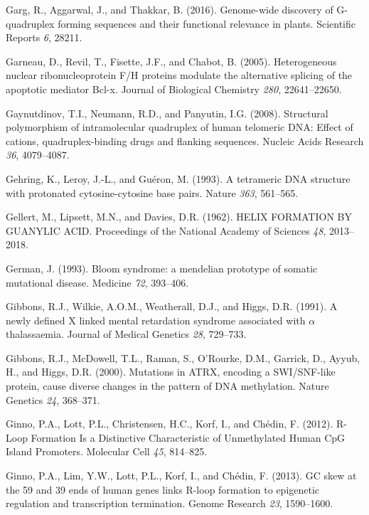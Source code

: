 \documentclass[12pt,a4paper,]{report}
\begin{document}
\leavevmode\hypertarget{ref-Garg2016}{}%
Garg, R., Aggarwal, J., and Thakkar, B. (2016). Genome-wide discovery of
G-quadruplex forming sequences and their functional relevance in plants.
Scientific Reports \emph{6}, 28211.

\leavevmode\hypertarget{ref-Garneau2005}{}%
Garneau, D., Revil, T., Fisette, J.F., and Chabot, B. (2005).
Heterogeneous nuclear ribonucleoprotein F/H proteins modulate the
alternative splicing of the apoptotic mediator Bcl-x. Journal of
Biological Chemistry \emph{280}, 22641--22650.

\leavevmode\hypertarget{ref-Gaynutdinov2008}{}%
Gaynutdinov, T.I., Neumann, R.D., and Panyutin, I.G. (2008). Structural
polymorphism of intramolecular quadruplex of human telomeric DNA: Effect
of cations, quadruplex-binding drugs and flanking sequences. Nucleic
Acids Research \emph{36}, 4079--4087.

\leavevmode\hypertarget{ref-Gehring1993}{}%
Gehring, K., Leroy, J.-L., and Guéron, M. (1993). A tetrameric DNA
structure with protonated cytosine-cytosine base pairs. Nature
\emph{363}, 561--565.

\leavevmode\hypertarget{ref-Gellert1962}{}%
Gellert, M., Lipsett, M.N., and Davies, D.R. (1962). HELIX FORMATION BY
GUANYLIC ACID. Proceedings of the National Academy of Sciences
\emph{48}, 2013--2018.

\leavevmode\hypertarget{ref-German1993}{}%
German, J. (1993). Bloom syndrome: a mendelian prototype of somatic
mutational disease. Medicine \emph{72}, 393--406.

\leavevmode\hypertarget{ref-Gibbons1991}{}%
Gibbons, R.J., Wilkie, A.O.M., Weatherall, D.J., and Higgs, D.R. (1991).
A newly defined X linked mental retardation syndrome associated with
\(\alpha\) thalassaemia. Journal of Medical Genetics \emph{28},
729--733.

\leavevmode\hypertarget{ref-Gibbons2000}{}%
Gibbons, R.J., McDowell, T.L., Raman, S., O'Rourke, D.M., Garrick, D.,
Ayyub, H., and Higgs, D.R. (2000). Mutations in ATRX, encoding a
SWI/SNF-like protein, cause diverse changes in the pattern of DNA
methylation. Nature Genetics \emph{24}, 368--371.

\leavevmode\hypertarget{ref-Ginno2012}{}%
Ginno, P.A., Lott, P.L., Christensen, H.C., Korf, I., and Chédin, F.
(2012). R-Loop Formation Is a Distinctive Characteristic of Unmethylated
Human CpG Island Promoters. Molecular Cell \emph{45}, 814--825.

\leavevmode\hypertarget{ref-Ginno2013}{}%
Ginno, P.A., Lim, Y.W., Lott, P.L., Korf, I., and Chédin, F. (2013). GC
skew at the 59 and 39 ends of human genes links R-loop formation to
epigenetic regulation and transcription termination. Genome Research
\emph{23}, 1590--1600.
\end{document}
